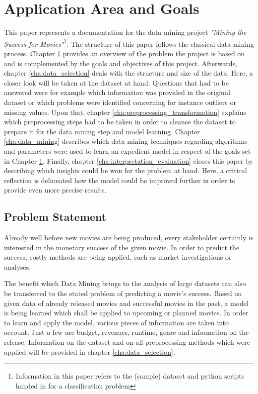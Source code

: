 \chapter{Application Area and Goals}
\label{cha:area_goals}
This paper represents a documentation for the data mining project \textit{"Mining the Success for Movies"}\footnote{ Information in this paper refers to the (sample) dataset and python scripts handed in for a classification problem}. The structure of this paper follows the classical data mining process. Chapter \ref{cha:area_goals} provides an overview of the problem the project is based on and is complemented by the goals and objectives of this project. Afterwards, chapter \ref{cha:data_selection} deals with the structure and size of the data. Here, a closer look will be taken at the dataset at hand. Questions that had to be answered were for example which information was provided in the original dataset or which problems were identified concerning for instance outliers or missing values. Upon that, chapter \ref{cha:preprocessing_transformation} explains which preprocessing steps had to be taken in order to cleanse the dataset to prepare it for the data mining step and model learning. Chapter \ref{cha:data_mining} describes which data mining techniques regarding algorithms and parameters were used to learn an expedient model in respect of the goals set in Chapter \ref{cha:area_goals}. Finally, chapter \ref{cha:interpretation_evaluation} closes this paper by describing which insights could be won for the problem at hand. Here, a critical reflection is delineated how the model could be improved further in order to provide even more precise results.

\section{Problem Statement}
Already well before new movies are being produced, every stakeholder certainly is interested in the monetary success of the given movie. In order to predict the success, costly methods are being applied, such as market investigations or analyses.

The benefit which Data Mining brings to the analysis of large datasets can also be transferred to the stated problem of predicting a movie's success. Based on given data of already released movies and successful movies in the past, a model is being learned which shall be applied to upcoming or planned movies. In order to learn and apply the model, various pieces of information are taken into account. Just a few are budget, revenues, runtime, genre and information on the release. Information on the dataset and on all preprocessing methods which were applied will be provided in chapter \ref{cha:data_selection}.

